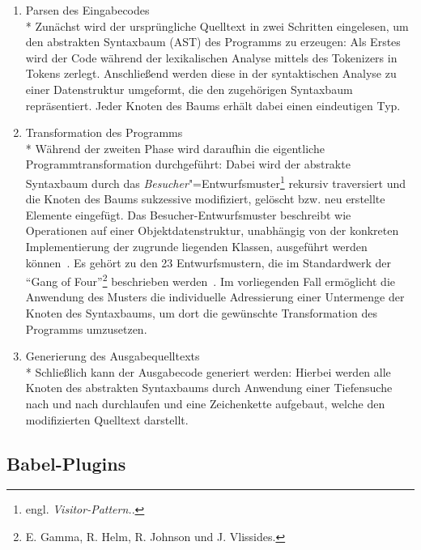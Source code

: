 \begin{enumerate}
  \item {\libertineSB Parsen des Eingabecodes}\\*
    Zunächst wird der ursprüngliche Quelltext in zwei Schritten eingelesen, um den abstrakten Syntaxbaum (AST) des Programms zu erzeugen: Als Erstes wird der Code während der lexikalischen Analyse mittels des Tokenizers in Tokens zerlegt. Anschließend werden diese in der syntaktischen Analyse zu einer Datenstruktur umgeformt, die den zugehörigen Syntaxbaum repräsentiert. Jeder Knoten des Baums erhält dabei einen eindeutigen Typ.
    \\

  \item {\libertineSB Transformation des Programms}\\*
    Während der zweiten Phase wird daraufhin die eigentliche Programmtransformation durchgeführt: Dabei wird der abstrakte Syntaxbaum durch das \emph{Besucher}"=Entwurfsmuster\footnote{engl. \textit{Visitor-Pattern.}.} rekursiv traversiert und die Knoten des Baums sukzessive modifiziert, gelöscht bzw. neu erstellte Elemente eingefügt. Das Besucher-Entwurfsmuster beschreibt wie Operationen auf einer Objektdatenstruktur, unabhängig von der konkreten Implementierung der zugrunde liegenden Klassen, ausgeführt werden können~\autocite[634\psq]{Freeman:2004}. Es gehört zu den 23 Entwurfsmustern, die im Standardwerk  der \enquote{Gang of Four}\footnote{E. Gamma, R. Helm, R. Johnson und J. Vlissides.} beschrieben werden~\autocite[306\psqq]{GAMMA:1994}. Im vorliegenden Fall ermöglicht die Anwendung des Musters die individuelle Adressierung einer Untermenge der Knoten des Syntaxbaums, um dort die gewünschte Transformation des Programms umzusetzen.
    \\

  \item {\libertineSB Generierung des Ausgabequelltexts}\\*
    Schließlich kann der Ausgabecode generiert werden: Hierbei werden alle Knoten des abstrakten Syntaxbaums durch Anwendung einer Tiefensuche nach und nach durchlaufen und eine Zeichenkette aufgebaut, welche den modifizierten Quelltext darstellt.
\end{enumerate}

\subsection{Babel-Plugins}
\label{subsection:babel-plugins}

